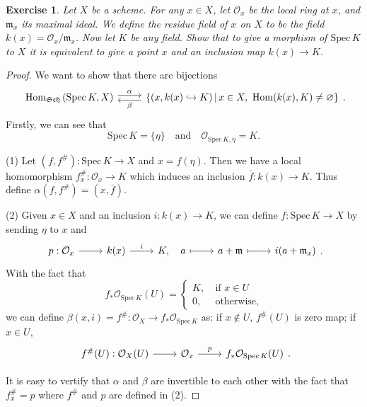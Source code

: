 \documentclass{amsart}
\newtheorem{exe}{Exercise}[subsection]
\begin{document}
\begin{exe}
	Let $X$ be a scheme. For any $x\in X$, let $\mathcal{O}_x$ be the local ring at $x$, and $\mathfrak{m}_x$ its maximal ideal. We define the \emph{residue field} of $x$ on $X$ to be the field $k(x)=\mathcal{O}_x/\mathfrak{m}_x$. Now let $K$ be any field. Show that to give a morphism of $\mathrm{Spec}\,K$ to $X$ it is equivalent to give a point $x$ and an inclusion map $k(x)\to K$.
\end{exe}
\begin{proof}
	We want to show that there are bijections
	\begin{equation*}
		\begin{tikzcd}
			{\mathrm{Hom}_{\mathfrak{Sch}}\left(\mathrm{Spec}\,K,X\right)} \arrow[r, "\alpha", shift left] & {\{(x,k(x)\hookrightarrow K)\,|\,x\in X,\ \mathrm{Hom}(k(x),K)\neq\varnothing\}} \arrow[l, "\beta", shift left]
		\end{tikzcd}.
	\end{equation*}
	Firstly, we can see that$$\mathrm{Spec}\,K=\{\eta\}\quad\text{and}\quad\mathcal{O}_{\mathrm{Spec}\,K,\eta}=K.$$
	
	(1) Let $(f,f^\#):\mathrm{Spec}\,K\to X$ and $x=f(\eta)$. Then we have a local homomorphism $f_x^\#:\mathcal{O}_x\to K$ which induces an inclusion $\bar{f}:k(x)\to K$. Thus define $\alpha(f,f^\#)=(x,\bar{f})$.
	
	(2) Given $x\in X$ and an inclusion $i:k(x)\to K$, we can define $f:\mathrm{Spec}\,K\to X$ by sending $\eta$ to $x$ and
	\begin{equation*}
		\begin{tikzcd}
			p:\mathcal{O}_x \arrow[r] & k(x) \arrow[r, "i"] & {K,\quad a} \arrow[r, maps to] & a+\mathfrak{m} \arrow[r, maps to] & i(a+\mathfrak{m}_x)
		\end{tikzcd}.
	\end{equation*}
	With the fact that
	\begin{equation*}
	f_*\mathcal{O}_{\mathrm{Spec}\,K}(U)=\left\{\begin{matrix}
	K,\ &\text{if }x\in U\\
	0,\ &\text{otherwise},
	\end{matrix}
	\right.
	\end{equation*}
	we can define $\beta(x,i)=f^\#:\mathcal{O}_X\to f_*\mathcal{O}_{\mathrm{Spec}\,K}$ as: if $x\notin U$, $f^\#(U)$ is zero map; if $x\in U$,
	\begin{equation*}
		\begin{tikzcd}
			f^\#(U):\mathcal{O}_X(U) \arrow[r] & \mathcal{O}_x \arrow[r, "p"] & {f_*\mathcal{O}_{\mathrm{Spec}\,K}(U)}
		\end{tikzcd}.
	\end{equation*}
	
	It is easy to vertify that $\alpha$ and $\beta$ are invertible to each other with the fact that $f^\#_x=p$ where $f^\#$ and $p$ are defined in (2).
\end{proof}
\end{document}
